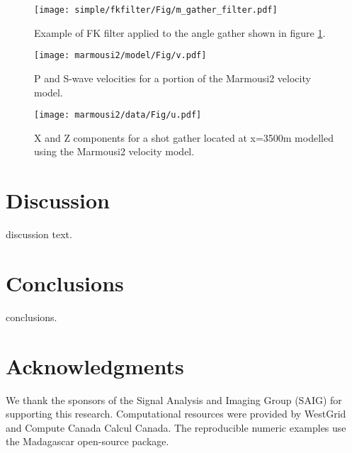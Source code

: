 \begin{figure}
\centering
\texttt{[image: simple/fkfilter/Fig/m\_gather\_filter.pdf]}
\caption{Example of FK filter applied to the angle gather shown in figure \ref{fig:m_gather_simple}.}
\label{fig:m_gather_simple}
\end{figure}


\begin{figure}
\centering
\texttt{[image: marmousi2/model/Fig/v.pdf]}
\caption{P and S-wave velocities for a portion of the Marmousi2 velocity model.}
\label{fig:v_marmousi2}
\end{figure}

\begin{figure}
\centering
\texttt{[image: marmousi2/data/Fig/u.pdf]}
\caption{X and Z components for a shot gather located at x=3500m modelled using the Marmousi2 velocity model.}
\label{fig:u_marmousi2}
\end{figure}
\section{Discussion}

discussion text.

\section{Conclusions}

conclusions.

\section{Acknowledgments}

We thank the sponsors of the Signal Analysis and Imaging Group (SAIG) for supporting this research. Computational resources were provided by WestGrid and Compute Canada Calcul Canada. The reproducible numeric examples use the Madagascar open-source package.




